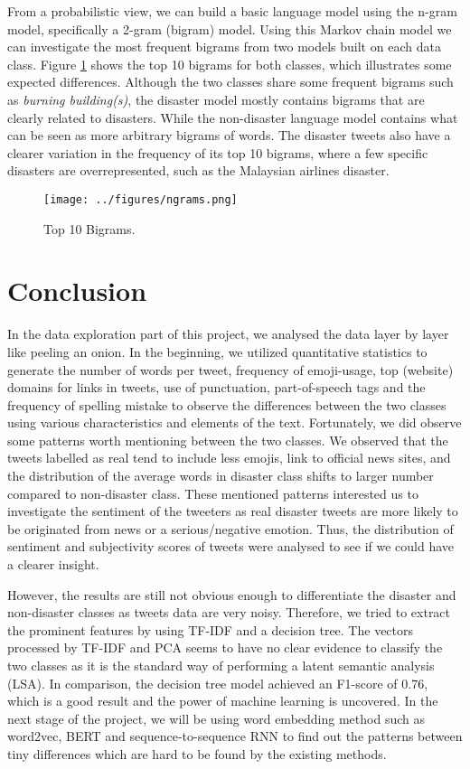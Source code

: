 \documentclass[journal, ]{IEEEtran}
\let\MYoriglatexcaption\caption
\renewcommand{\caption}[2][\relax]{\MYoriglatexcaption[#2]{#2}}
\begin{document}
From a probabilistic view, we can build a basic language model using the n-gram
model, specifically a 2-gram (bigram) model. Using this Markov chain model we
can investigate the most frequent bigrams from two models built on each data
class. Figure \ref{fig:ngram} shows the top 10 bigrams for both classes, which
illustrates some expected differences. Although the two classes share some
frequent bigrams such as \textit{burning building(s)}, the disaster model
mostly contains bigrams that are clearly related to disasters. While the
non-disaster language model contains what can be seen as more arbitrary bigrams
of words. The disaster tweets also have a clearer variation in the frequency of
its top 10 bigrams, where a few specific disasters are overrepresented, such as
the Malaysian airlines disaster.

\begin{figure}[hbt!]
  \centering
  \texttt{[image: ../figures/ngrams.png]}
  \caption{Top 10 Bigrams.}
  \label{fig:ngram}
\end{figure}

\section{Conclusion}
In the data exploration part of this project, we analysed the data layer by
layer like peeling an onion. In the beginning, we utilized quantitative
statistics to generate the number of words per tweet, frequency of emoji-usage,
top (website) domains for links in tweets, use of punctuation, part-of-speech
tags and the frequency of spelling mistake to observe the differences between
the two classes using various characteristics and elements of the text.
Fortunately, we did observe some patterns worth mentioning between the two
classes. We observed that the tweets labelled as real tend to include less
emojis, link to official news sites, and the distribution of the average words
in disaster class shifts to larger number compared to non-disaster class. These
mentioned patterns interested us to investigate the sentiment of the tweeters
as real disaster tweets are more likely to be originated from news or a
serious/negative emotion. Thus, the distribution of sentiment and subjectivity
scores of tweets were analysed to see if we could have a clearer insight.

However, the results are still not obvious enough to differentiate the disaster
and non-disaster classes as tweets data are very noisy. Therefore, we tried to
extract the prominent features by using TF-IDF and a decision tree. The vectors
processed by TF-IDF and PCA seems to have no clear evidence to classify the two
classes as it is the standard way of performing a latent semantic analysis
(LSA). In comparison, the decision tree model achieved an F1-score of 0.76,
which is a good result and the power of machine learning is uncovered. In the
next stage of the project, we will be using word embedding method such as
word2vec, BERT and sequence-to-sequence RNN to find out the patterns between
tiny differences which are hard to be found by the existing methods.
\end{document}
